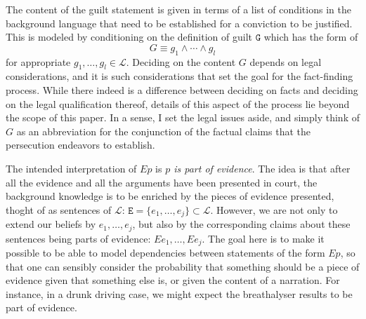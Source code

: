 \documentclass[10pt,leqno]{article}
\newcommand{\et}{\wedge}
\begin{document}
The content of the guilt statement is given in terms of a list of conditions in the background language that need to be established for a conviction to be justified. This is modeled by conditioning on the definition of guilt  $\mathtt{G}$ which has the form of 
\[ G\equiv g_1\et \cdots \et g_l\] 
\noindent  for appropriate $g_1, \dots, g _l\in \mathcal{L}$. Deciding on the content $G$ depends on legal considerations, and it is such considerations that set the goal for the fact-finding process. While there indeed is a difference between deciding on facts and deciding on the legal qualification thereof, details of this aspect of the process lie beyond the scope of this paper. In a sense, I  set the legal issues aside, and simply think of $G$ as an abbreviation for the conjunction of the factual claims that the persecution endeavors to establish. 



 

The intended interpretation of $Ep$  is \emph{$p$ is part of evidence}. The idea is that 
after all the evidence and all the arguments have been presented in court, the background knowledge is to be  enriched by the  pieces of evidence presented, thoght of as sentences of $\mathcal{L}$:   $\mathtt{E} = \{e_1,\dots, e_j\}\subset \mathcal{L}$. However, we are not only to extend our beliefs by $e_1,\dots, e_j$, but also by the corresponding claims about these sentences being parts of evidence: $Ee_1, \dots, E e_j$. The goal here is to make it possible to be able to model dependencies between statements of the form $Ep$, so that one can sensibly consider the probability that something should be a piece of evidence given that something else is, or given the content of a narration. For instance, in a drunk driving case, we might expect the breathalyser results to be part of evidence. 


\end{document}
